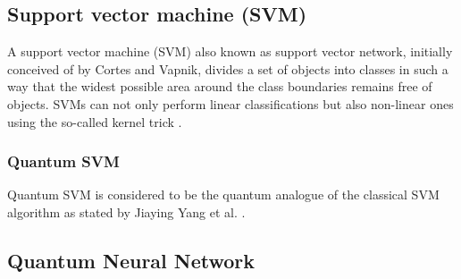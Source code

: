 \subsection{Support vector machine (SVM)}
A support vector machine (SVM) also known as support vector network, initially conceived of by Cortes and Vapnik, divides a set of objects into classes in such a way that the widest possible area around the class boundaries remains free of objects. SVMs can not only perform linear classifications but also non-linear ones using the so-called kernel trick \cite{Cortes2004SupportVectorN,fletcher2009support}.

\subsubsection{Quantum SVM}
Quantum SVM is considered to be the quantum analogue of the classical SVM algorithm as stated by Jiaying Yang et al. \cite{yangSupportVectorMachines2019}.

\subsection{Quantum Neural Network}
